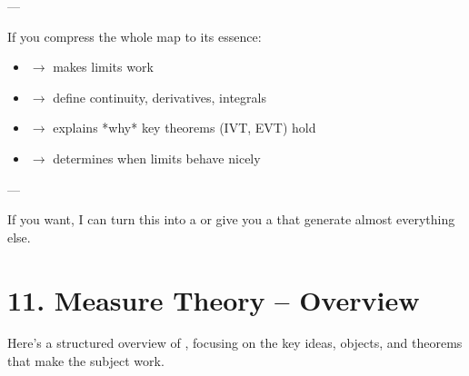 \documentclass[12pt,a4paper]{report}
\begin{document}
\begin{description}
---

\item {}

If you compress the whole map to its essence:

		\begin{itemize}
        \item {} $\to$ makes limits work
        \item {} $\to$ define continuity, derivatives, integrals
        \item {} $\to$ explains *why* key theorems (IVT, EVT) hold
        \item {} $\to$ determines when limits behave nicely
		\end{itemize}

---
\end{description}

If you want, I can turn this into a  or give you a  that generate almost everything else.

\newpage
\section*{11. Measure Theory -- Overview}


Here’s a structured overview of , focusing on the key ideas, objects, and theorems that make the subject work.
\end{document}
